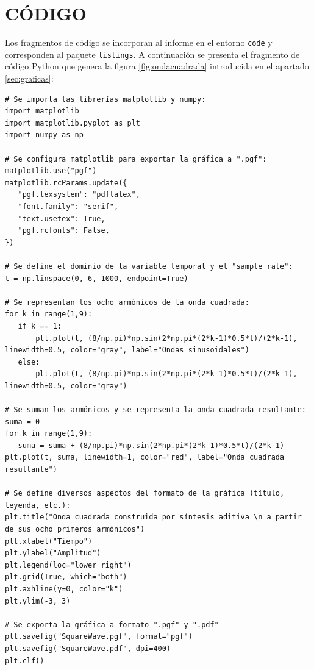 
\section{CÓDIGO} \label{sec:codigo}

Los  fragmentos de código se incorporan al informe en el entorno \texttt{code} y corresponden al paquete \texttt{listings}. A continuación se presenta el fragmento de código Python que genera la figura \ref{fig:ondacuadrada} introducida en el apartado \ref{sec:graficas}:

\vspace{-5pt}

\begin{code}[H]
\begin{lstlisting}[firstnumber=1, breakindent=55pt]
# Se importa las librerías matplotlib y numpy:
import matplotlib
import matplotlib.pyplot as plt
import numpy as np

# Se configura matplotlib para exportar la gráfica a ".pgf":
matplotlib.use("pgf")
matplotlib.rcParams.update({
   "pgf.texsystem": "pdflatex",
   "font.family": "serif",
   "text.usetex": True,
   "pgf.rcfonts": False,
})

# Se define el dominio de la variable temporal y el "sample rate":
t = np.linspace(0, 6, 1000, endpoint=True)

# Se representan los ocho armónicos de la onda cuadrada:
for k in range(1,9):
   if k == 1:
       plt.plot(t, (8/np.pi)*np.sin(2*np.pi*(2*k-1)*0.5*t)/(2*k-1), linewidth=0.5, color="gray", label="Ondas sinusoidales")
   else:
       plt.plot(t, (8/np.pi)*np.sin(2*np.pi*(2*k-1)*0.5*t)/(2*k-1), linewidth=0.5, color="gray")

# Se suman los armónicos y se representa la onda cuadrada resultante:
suma = 0 
for k in range(1,9):
   suma = suma + (8/np.pi)*np.sin(2*np.pi*(2*k-1)*0.5*t)/(2*k-1)
plt.plot(t, suma, linewidth=1, color="red", label="Onda cuadrada resultante")

# Se define diversos aspectos del formato de la gráfica (título, leyenda, etc.):
plt.title("Onda cuadrada construida por síntesis aditiva \n a partir de sus ocho primeros armónicos")
plt.xlabel("Tiempo")
plt.ylabel("Amplitud")
plt.legend(loc="lower right")
plt.grid(True, which="both")
plt.axhline(y=0, color="k")
plt.ylim(-3, 3)

# Se exporta la gráfica a formato ".pgf" y ".pdf"
plt.savefig("SquareWave.pgf", format="pgf")
plt.savefig("SquareWave.pdf", dpi=400)
plt.clf()
\end{lstlisting}
\vspace{-5pt}
\caption{Código utilizado para generar la gráfica \ref{fig:ondacuadrada}}
\label{cod:ondacuadrada}
\end{code}

